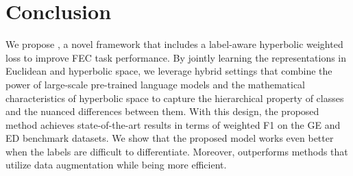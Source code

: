 \section{Conclusion}
We propose \modelname, a novel framework that includes a
label-aware hyperbolic weighted loss to improve FEC task performance. By jointly
learning the representations in Euclidean and hyperbolic space,
we leverage hybrid settings that combine the power of large-scale
pre-trained language models and the mathematical characteristics of hyperbolic
space to capture the hierarchical property of classes and the nuanced differences
between them. With this design, the proposed method achieves 
state-of-the-art results in terms of weighted F1 on the GE and ED benchmark datasets.
We show that the proposed model works even better when the labels
are difficult to differentiate. 
Moreover, \wsmodelname outperforms methods that utilize data augmentation while being more efficient. 


